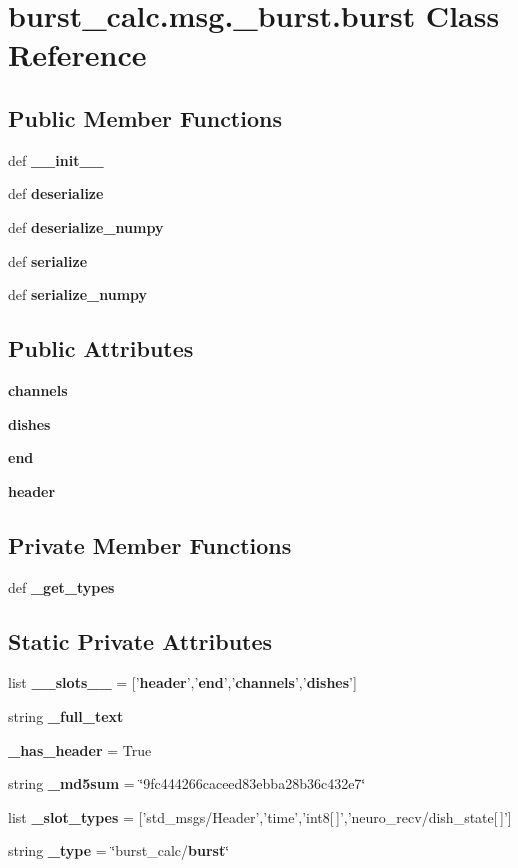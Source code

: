 \section{burst\-\_\-calc.\-msg.\-\_\-burst.\-burst \-Class \-Reference}
\label{classburst__calc_1_1msg_1_1__burst_1_1burst}
\subsection*{\-Public \-Member \-Functions}
\begin{DoxyCompactItemize}
\item 
def {\bf \-\_\-\-\_\-init\-\_\-\-\_\-}
\item 
def {\bf deserialize}
\item 
def {\bf deserialize\-\_\-numpy}
\item 
def {\bf serialize}
\item 
def {\bf serialize\-\_\-numpy}
\end{DoxyCompactItemize}
\subsection*{\-Public \-Attributes}
\begin{DoxyCompactItemize}
\item 
{\bf channels}
\item 
{\bf dishes}
\item 
{\bf end}
\item 
{\bf header}
\end{DoxyCompactItemize}
\subsection*{\-Private \-Member \-Functions}
\begin{DoxyCompactItemize}
\item 
def {\bf \-\_\-get\-\_\-types}
\end{DoxyCompactItemize}
\subsection*{\-Static \-Private \-Attributes}
\begin{DoxyCompactItemize}
\item 
list {\bf \-\_\-\-\_\-slots\-\_\-\-\_\-} = ['{\bf header}','{\bf end}','{\bf channels}','{\bf dishes}']
\item 
string {\bf \-\_\-full\-\_\-text}
\item 
{\bf \-\_\-has\-\_\-header} = \-True
\item 
string {\bf \-\_\-md5sum} = \char`\"{}9fc444266caceed83ebba28b36c432e7\char`\"{}
\item 
list {\bf \-\_\-slot\-\_\-types} = ['std\-\_\-msgs/\-Header','time','int8[$\,$]','neuro\-\_\-recv/dish\-\_\-state[$\,$]']
\item 
string {\bf \-\_\-type} = \char`\"{}burst\-\_\-calc/{\bf burst}\char`\"{}
\end{DoxyCompactItemize}



